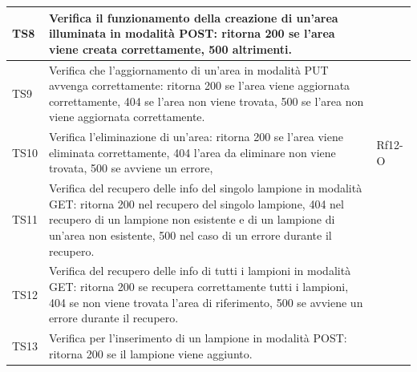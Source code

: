 \documentclass[a4paper, 12pt]{article}
\begin{document}
\begin{center}
	\begin{tabularx}{\textwidth}{|X|X|X|}
	\hline
		TS8 & Verifica il funzionamento della creazione di un'area illuminata in modalità POST: ritorna 200 se l'area viene creata correttamente, 500 altrimenti. & \\
		\hline
		TS9 & Verifica che l'aggiornamento di un'area in modalità PUT avvenga correttamente: ritorna 200 se l'area viene aggiornata correttamente, 404 se l'area non viene trovata, 500 se l'area non viene aggiornata correttamente.  &  \\
		\hline
		TS10 & Verifica l'eliminazione di un'area: ritorna 200 se l'area viene eliminata correttamente, 404 l'area da eliminare non viene trovata, 500 se avviene un errore,    & Rf12-O \\
		\hline
		TS11 &  Verifica del recupero delle info del singolo lampione in modalità GET: ritorna 200 nel recupero del singolo lampione, 404 nel recupero di un lampione non esistente e di un lampione di un'area non esistente, 500 nel caso di un errore durante il recupero.   &  \\
		\hline
		TS12 &  Verifica del recupero delle info di tutti i lampioni in modalità GET: ritorna 200 se recupera correttamente tutti i lampioni,  404 se non viene trovata l'area di riferimento, 500 se avviene un errore durante il recupero.  &  \\
		\hline
		TS13 & Verifica per l'inserimento di un lampione in modalità POST: ritorna 200 se il lampione viene aggiunto. & \\
		\hline
	\end{tabularx}\\[8pt]
	\mbox{}\\
\end{center}
\end{document}
